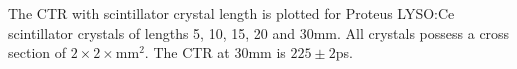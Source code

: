 \label{fig:standardctr} The CTR with scintillator crystal length is plotted for Proteus LYSO:Ce scintillator crystals of lengths 5, 10, 15, 20 and 30mm. All crystals possess a cross section of $2\times2\times$mm$^2$. The CTR at 30mm is $225\pm2$ps.